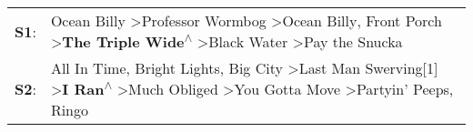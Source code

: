 \begin{supertabular}{p{0.03\textwidth}p{0.92\textwidth}}
 \textbf{S1}:  &                                             Ocean Billy\textsuperscript{} \textgreater \enspace Professor Wormbog\textsuperscript{} \textgreater \enspace Ocean Billy\textsuperscript{}, \enspace Front Porch\textsuperscript{} \textgreater \enspace \textbf{The Triple Wide\textsuperscript{$\wedge$}} \textgreater \enspace Black Water\textsuperscript{} \textgreater \enspace Pay the Snucka\textsuperscript{}  \enspace  \\
 \textbf{S2}:  &  All In Time\textsuperscript{}, \enspace Bright Lights, Big City\textsuperscript{} \textgreater \enspace Last Man Swerving[1]\textsuperscript{} \textgreater \enspace \textbf{I Ran\textsuperscript{$\wedge$}} \textgreater \enspace Much Obliged\textsuperscript{} \textgreater \enspace You Gotta Move\textsuperscript{} \textgreater \enspace Partyin' Peeps\textsuperscript{}, \enspace Ringo\textsuperscript{}  \enspace  \\
\end{supertabular}
